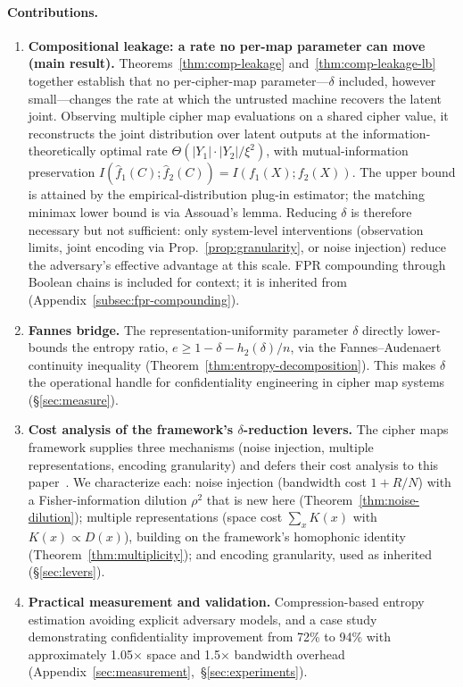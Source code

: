 \documentclass[conference]{IEEEtran}
\theoremstyle{definition}
\theoremstyle{plain}
\theoremstyle{remark}
\newcommand{\fhat}{\hat{f}}
\begin{document}
\paragraph{Contributions.}
\begin{enumerate}
\item \textbf{Compositional leakage: a rate no per-map parameter can
  move (main result).}  Theorems~\ref{thm:comp-leakage}
  and~\ref{thm:comp-leakage-lb} together establish that no
  per-cipher-map parameter---$\delta$ included, however small---changes
  the rate at which the untrusted machine recovers the latent joint.
  Observing multiple cipher map evaluations on a shared cipher value,
  it reconstructs the joint distribution over latent outputs at the
  information-theoretically optimal rate
  $\Theta(|Y_1|\cdot|Y_2|/\xi^2)$, with mutual-information preservation
  $I(\fhat_1(C); \fhat_2(C)) = I(f_1(X); f_2(X))$.  The upper bound is
  attained by the empirical-distribution plug-in estimator; the
  matching minimax lower bound is via Assouad's lemma.  Reducing
  $\delta$ is therefore necessary but not
  sufficient: only system-level interventions (observation limits,
  joint encoding via Prop.~\ref{prop:granularity}, or noise injection)
  reduce the adversary's effective advantage at this scale.  FPR
  compounding through Boolean chains is included for context; it is
  inherited from~\cite{towell2026cipher} (Appendix~\ref{subsec:fpr-compounding}).

\item \textbf{Fannes bridge.}  The representation-uniformity parameter
  $\delta$ directly lower-bounds the entropy ratio,
  $e \geq 1 - \delta - h_2(\delta)/n$, via the Fannes--Audenaert
  continuity inequality (Theorem~\ref{thm:entropy-decomposition}).
  This makes $\delta$ the operational handle for confidentiality
  engineering in cipher map systems (\S\ref{sec:measure}).

\item \textbf{Cost analysis of the framework's $\delta$-reduction
  levers.}  The cipher maps framework supplies three mechanisms
  (noise injection, multiple representations, encoding granularity) and
  defers their cost analysis to this paper~\cite[Rem.~5.1]{towell2026cipher}.
  We characterize each: noise injection (bandwidth cost $1 + R/N$) with
  a Fisher-information dilution $\rho^2$ that is new here
  (Theorem~\ref{thm:noise-dilution}); multiple representations (space
  cost $\sum_x K(x)$ with $K(x)\propto D(x)$), building on the
  framework's homophonic identity~\cite[Prop.~4.1]{towell2026cipher}
  (Theorem~\ref{thm:multiplicity}); and encoding granularity, used as
  inherited (\S\ref{sec:levers}).

\item \textbf{Practical measurement and validation.}  Compression-based
  entropy estimation avoiding explicit adversary models, and a case
  study demonstrating confidentiality improvement from 72\% to 94\%
  with approximately 1.05$\times$ space and 1.5$\times$ bandwidth
  overhead (Appendix~\ref{sec:measurement},~\S\ref{sec:experiments}).
\end{enumerate}
\end{document}
